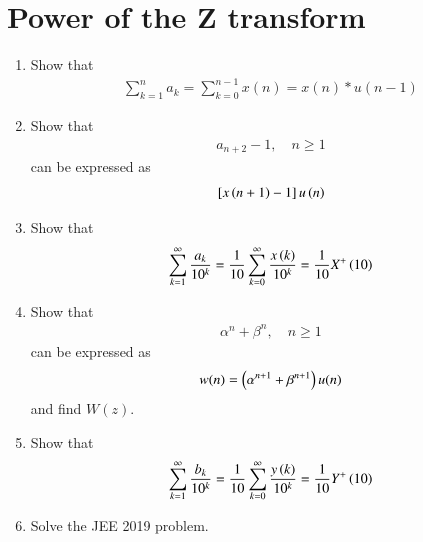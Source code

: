 \documentclass[journal,12pt,twocolumn]{IEEEtran}
\renewcommand\thesection{\arabic{section}}
\begin{document}
\section{Power of the Z transform}
\begin{enumerate}[label=\thesection.\arabic*,ref=\thesection.\theenumi]
\item Show that 
\begin{align}
	\sum_{k=1}^{n}a_k = 
	\sum_{k=0}^{n-1}x(n) = x(n)*u(n-1)
\end{align}
\item Show that 
\begin{align}
a_{n+2}-1, \quad n \ge 1
\end{align}
can be expressed as 
\begin{align}
	{}\left[x\left(n+1\right)-1\right]u\left(n\right)
\end{align}
 \item Show that 
\begin{align}
	\sum_{k=1}^{\infty}\frac{a_k}{10^k}= 
	\frac{1}{10}\sum_{k=0}^{\infty}\frac{x\left(k\right)}{10^k} =\frac{1}{10}X^{+}\left({10}\right)
\end{align}
 \item Show that 
\begin{align}
	\alpha^n + \beta^n, \quad n \ge 1
\end{align}
can be expressed as 
\begin{align}
	w(n) =\left(\alpha^{n+1} + \beta^{n+1}\right)u(n)
\end{align}
		and find $W(z)$.

 \item Show that 
\begin{align}
	\sum_{k=1}^{\infty}\frac{b_k}{10^k} =
	\frac{1}{10}\sum_{k=0}^{\infty}\frac{y\left(k\right)}{10^k} =\frac{1}{10}Y^{+}\left({10}\right)
\end{align}
\item Solve the JEE 2019 problem.

\end{enumerate}
\end{document}
